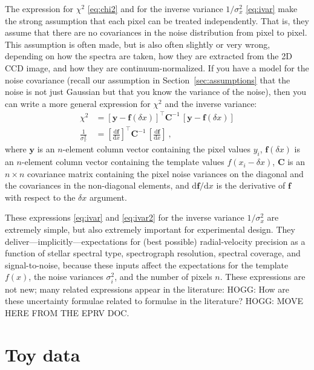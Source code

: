 \documentclass[modern]{aastex631}
\newcommand{\dd}{\mathrm{d}}
\newcommand{\lao}[1]{\boldsymbol{#1}}
\newcommand{\vy}{\lao{y}}
\newcommand{\vf}{\lao{f}}
\newcommand{\vC}{\lao{C}}
\newcommand{\sectionname}{Section}
\newcommand{\secref}[1]{\sectionname~\ref{#1}}
\begin{document}
The expression for $\chi^2$ \eqref{eq:chi2} and for the inverse variance $1/\sigma_x^2$ \eqref{eq:ivar} make the strong assumption that each pixel can be treated independently.
That is, they assume that there are no covariances in the noise distribution from pixel to pixel.
This assumption is often made, but is also often slightly or very wrong, depending on how the spectra are taken, how they are extracted from the 2D CCD image, and how they are continuum-normalized.
If you have a model for the noise covariance (recall our assumption in \secref{sec:assumptions} that the noise is not just Gaussian but that you know the variance of the noise), then you can write a more general expression for $\chi^2$ and the inverse variance:
\begin{align}
    \chi^2 &= [\vy - \vf(\delta x)]^\top\vC^{-1}\,[\vy - \vf(\delta x)]\\
    \frac{1}{\sigma_x^2} &= \left[\frac{\dd\vf}{\dd x}\right]^\top\vC^{-1}\,\left[\frac{\dd\vf}{\dd x}\right]\label{eq:ivar2} ~,
\end{align}
where $\vy$ is an $n$-element column vector containing the pixel values $y_i$,
$\vf(\delta x)$ is an $n$-element column vector containing the template values $f(x_i-\delta x)$,
$\vC$ is an $n\times n$ covariance matrix containing the pixel noise variances on the diagonal and the covariances in the non-diagonal elements,
and $\dd\vf/\dd x$ is the derivative of $\vf$ with respect to the $\delta x$ argument.

These expressions \eqref{eq:ivar} and \eqref{eq:ivar2} for the inverse variance $1/\sigma_x^2$ are extremely simple, but also extremely important for experimental design.
They deliver---implicitly---expectations for (best possible) radial-velocity precision as a function of stellar spectral type, spectrograph resolution, spectral coverage, and signal-to-noise, because these inputs affect the expectations for the template $f(x)$, the noise variances $\sigma_i^2$, and the number of pixels $n$.
These expressions are not new; many related expressions appear in the literature:
HOGG: How are these uncertainty formulae related to formulae in the literature? HOGG: MOVE HERE FROM THE EPRV DOC.

\section{Toy data}\label{sec:data}
\end{document}
